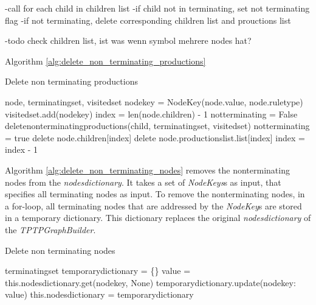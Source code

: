 -call for each child in children list
-if child not in terminating, set not terminating flag
-if not terminating, delete corresponding children list and prouctions list


-todo check children list, ist was wenn symbol mehrere nodes hat?

Algorithm \ref{alg:delete_non_terminating_productions} 
\begin{algorithm}[H]
\caption{Delete non terminating productions}
\begin{algorithmic}[1] 
\Require node, terminating\textunderscore set, visited\textunderscore set
\State node\textunderscore key = Node\textunderscore Key(node.value, node.rule\textunderscore type)
	\State visited\textunderscore set.add(node\textunderscore key)
	\State index = len(node.children) - 1
		\State not\textunderscore terminating = False
			\State delete\textunderscore non\textunderscore terminating\textunderscore productions(child, terminating\textunderscore set, visited\textunderscore set)
				\State not\textunderscore terminating = true
			\EndIf
		\EndFor
			\State delete node.children[index]
			\State delete node.productions\textunderscore list.list[index]
		\EndIf
		\State index = index - 1
\EndFor
\EndIf
\end{algorithmic}
\label{alg:delete_non_terminating_productions}
\end{algorithm}


Algorithm \ref{alg:delete_non_terminating_nodes} removes the nonterminating nodes from the \textit{nodes\textunderscore dictionary}. It takes a set of \textit{Node\textunderscore Keys}s as input, that specifies all terminating nodes as input.
To remove the nonterminating nodes, in a for-loop, all terminating nodes that are addressed by the \textit{Node\textunderscore Key}s are stored in a temporary dictionary. This dictionary replaces the original \textit{nodes\textunderscore dictionary} of the \textit{TPTPGraphBuilder}.
\begin{algorithm}[H]
\caption{Delete non terminating nodes}
\begin{algorithmic}[1] 
\Require terminating\textunderscore set
\State temporary\textunderscore dictionary = \{\}
	\State value = this.nodes\textunderscore dictionary.get(node\textunderscore key, None)
	\State temporary\textunderscore dictionary.update({node\textunderscore key: value})
\EndFor
\State this.nodes\textunderscore dictionary = temporary\textunderscore dictionary
\end{algorithmic}
\label{alg:delete_non_terminating_nodes}
\end{algorithm}


